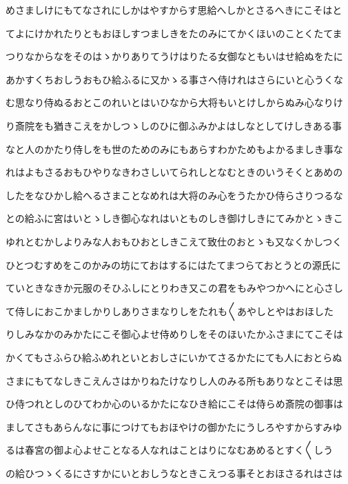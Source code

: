 \documentclass[a4paper,11pt,landscape]{ltjtarticle}
\begin{document}
めさましけにもてなされにしかはやすからす思給へしかとさるへきにこそはと
\par\medskip
てよにけかれたりともおほしすつましきをたのみにてかくほいのことくたてま
\par\medskip
つりなからなをそのはゝかりありてうけはりたる女御なともいはせ給ぬをたに
\par\medskip
あかすくちおしうおもひ給ふるに又かゝる事さへ侍けれはさらにいと心うくな
\par\medskip
む思なり侍ぬるおとこのれいとはいひなから大将もいとけしからぬみ心なりけ
\par\medskip
り斎院をも猶きこえをかしつゝしのひに御ふみかよはしなとしてけしきある事
\par\medskip
なと人のかたり侍しをも世のためのみにもあらすわかためもよかるましき事な
\par\medskip
れはよもさるおもひやりなきわさしいてられしとなむときのいうそくとあめの
\par\medskip
したをなひかし給へるさまことなめれは大将のみ心をうたかひ侍らさりつるな
\par\medskip
との給ふに宮はいとゝしき御心なれはいとものしき御けしきにてみかとゝきこ
\par\medskip
ゆれとむかしよりみな人おもひおとしきこえて致仕のおとゝも又なくかしつく
\par\medskip
ひとつむすめをこのかみの坊にておはするにはたてまつらておとうとの源氏に
\par\medskip
ていときなきか元服のそひふしにとりわき又この君をもみやつかへにと心さし
\par\medskip
て侍しにおこかましかりしありさまなりしをたれも〱あやしとやはおほした
\par\medskip
りしみなかのみかたにこそ御心よせ侍めりしをそのほいたかふさまにてこそは
\par\medskip
かくてもさふらひ給ふめれといとおしさにいかてさるかたにても人におとらぬ
\par\medskip
さまにもてなしきこえんさはかりねたけなりし人のみる所もありなとこそは思
\par\medskip
ひ侍つれとしのひてわか心のいるかたになひき給にこそは侍らめ斎院の御事は
\par\medskip
ましてさもあらんなに事につけてもおほやけの御かたにうしろやすからすみゆ
\par\medskip
るは春宮の御よ心よせことなる人なれはことはりになむあめるとすく〱しう
\par\medskip
の給ひつゝくるにさすかにいとおしうなときこえつる事そとおほさるれはさは
\par\medskip
\end{document}
